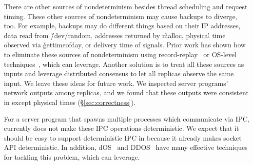 There are other sources of nondeterminism besides thread scheduling and
request timing.  These other sources of nondeterminism may cause backups
to diverge, too.  For example, backups may do different things based on
their IP addresses, data read from \v{/dev/random}, addresses returned by
\v{malloc}, physical time observed via \v{gettimeofday}, or delivery time
of signals.  Prior work has shown how to eliminate these sources of
nondeterminism using record-replay~\cite{scribe:sigmetrics2010, 
respec:asplos10} or OS-level techniques~\cite{dos:osdi10}, which \xxx can 
leverage.  Another solution is to treat all these sources as inputs and 
leverage distributed consensus to let all replicas observe the same input.  We 
leave these ideas for future work. We inspected server 
programs' network outputs among replicas, and we found that these outputs 
were consistent in \xxx except physical times (\S\ref{sec:correctness}).

For a server program that spawns multiple processes which communicate via
IPC, \xxx currently does not make these IPC operations deterministic.  We
expect that it should be easy to support deterministic IPC in \xxx because it
already makes socket API deterministic.  In addition,
dOS~\cite{dos:osdi10} and DDOS~\cite{ddos:asplos13} have many effective
techniques for tackling this problem, which \xxx can leverage.


